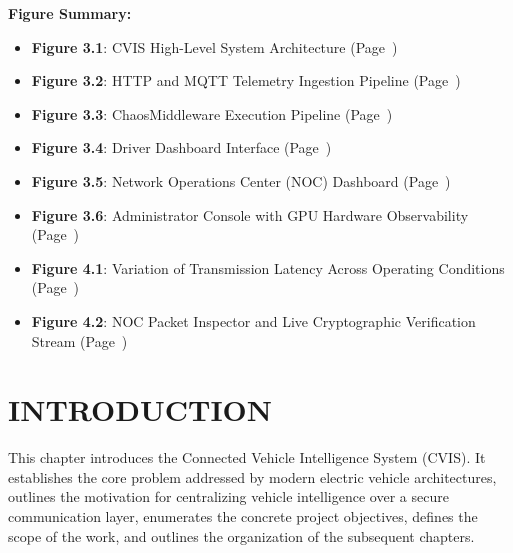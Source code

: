 \documentclass[12pt,a4paper]{report}
\begin{document}
\listoffigures
\vspace{1cm}
\noindent\textbf{Figure Summary:}
\begin{itemize}[leftmargin=1.5cm, itemsep=0.3em]
    \item \textbf{Figure 3.1}: CVIS High-Level System Architecture (Page~\pageref{fig:architecture})
    \item \textbf{Figure 3.2}: HTTP and MQTT Telemetry Ingestion Pipeline (Page~\pageref{fig:ingest_pipeline})
    \item \textbf{Figure 3.3}: ChaosMiddleware Execution Pipeline (Page~\pageref{fig:chaos_pipeline})
    \item \textbf{Figure 3.4}: Driver Dashboard Interface (Page~\pageref{fig:driver_dashboard})
    \item \textbf{Figure 3.5}: Network Operations Center (NOC) Dashboard (Page~\pageref{fig:noc_dashboard})
    \item \textbf{Figure 3.6}: Administrator Console with GPU Hardware Observability (Page~\pageref{fig:admin_dashboard})
    \item \textbf{Figure 4.1}: Variation of Transmission Latency Across Operating Conditions (Page~\pageref{fig:results_chart})
    \item \textbf{Figure 4.2}: NOC Packet Inspector and Live Cryptographic Verification Stream (Page~\pageref{fig:noc_packet_inspector})
\end{itemize}
\newpage

\setcounter{page}{1}

\chapter{INTRODUCTION}

This chapter introduces the Connected Vehicle Intelligence System (CVIS). It establishes the core problem addressed by modern electric vehicle architectures, outlines the motivation for centralizing vehicle intelligence over a secure communication layer, enumerates the concrete project objectives, defines the scope of the work, and outlines the organization of the subsequent chapters.
\end{document}
